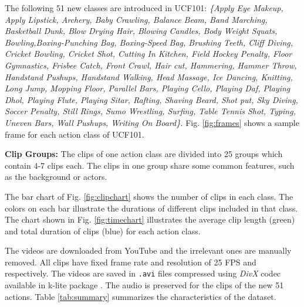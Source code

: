 \documentclass[10pt,twocolumn,letterpaper]{article}
\begin{document}
The following 51 new classes are introduced in UCF101:
\emph{\{{\color{NavyBlue}Apply Eye Makeup}, {\color{NavyBlue}Apply Lipstick}, {\color{ForestGreen}Archery},  {\color{red}Baby Crawling},  {\color{ForestGreen}Balance Beam},  {\color{RoyalPurple}Band Marching}, {\color{ForestGreen}Basketball Dunk},
{\color{NavyBlue}Blow Drying Hair}, {\color{red}Blowing Candles}, {\color{red}Body Weight Squats}, {\color{ForestGreen}Bowling},{\color{ForestGreen}Boxing-Punching Bag}, {\color{ForestGreen}Boxing-Speed Bag}, {\color{NavyBlue}Brushing Teeth},  {\color{ForestGreen}Cliff Diving}, {\color{ForestGreen}Cricket Bowling}, {\color{ForestGreen}Cricket Shot}, {\color{NavyBlue}Cutting In Kitchen}, {\color{ForestGreen}Field Hockey Penalty}, {\color{ForestGreen}Floor Gymnastics}, {\color{ForestGreen}Frisbee Catch}, {\color{ForestGreen}Front Crawl}, {\color{RoyalPurple}Hair cut}, {\color{NavyBlue}Hammering}, {\color{ForestGreen}Hammer Throw}, {\color{red}Handstand Pushups}, {\color{red}Handstand Walking}, {\color{RoyalPurple}Head Massage}, {\color{ForestGreen}Ice Dancing}, {\color{NavyBlue}Knitting}, {\color{ForestGreen}Long Jump}, {\color{NavyBlue}Mopping Floor}, {\color{ForestGreen}Parallel Bars}, {\color{YellowOrange}Playing Cello}, {\color{YellowOrange}Playing Daf}, {\color{YellowOrange}Playing Dhol}, {\color{YellowOrange}Playing Flute}, {\color{YellowOrange}Playing Sitar}, {\color{ForestGreen}Rafting}, {\color{NavyBlue}Shaving Beard}, {\color{ForestGreen}Shot put}, {\color{ForestGreen}Sky Diving}, {\color{ForestGreen}Soccer Penalty}, {\color{ForestGreen}Still Rings}, {\color{ForestGreen}Sumo Wrestling}, {\color{ForestGreen}Surfing}, {\color{ForestGreen}Table Tennis Shot}, {\color{NavyBlue}Typing}, {\color{ForestGreen}Uneven Bars}, {\color{red}Wall Pushups}, {\color{NavyBlue}Writing On Board}\}.
}
Fig. \ref{fig:frames} shows a sample frame for each action class of UCF101.

\textbf{Clip Groups: }The clips of one action class are divided into 25 groups which contain 4-7 clips each. The clips in one group share some common features, such as the background or actors.

The bar chart of Fig. \ref{fig:clipchart} shows the number of clips in each class. The colors on each bar illustrate the durations of different clips included in that class. The chart shown in Fig. \ref{fig:timechart} illustrates the average clip length (green) and total duration of clips (blue) for each action class.




The videos are downloaded from YouTube \cite{YouTube} and the irrelevant ones are manually removed. All clips have fixed frame rate and resolution of 25 FPS and  respectively. The videos are saved in {\tt .avi} files compressed using \emph{DivX} codec available in k-lite package \cite{klite}. The audio is preserved for the clips of the new 51 actions. Table \ref{tab:summary} summarizes the characteristics of the dataset.
\end{document}
